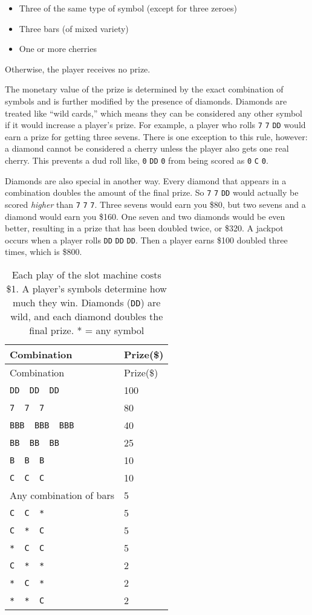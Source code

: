 \documentclass[
  letterpaper,
  DIV=11,
  numbers=noendperiod]{scrbook}
\providecommand{\tightlist}{%
  \setlength{\itemsep}{0pt}\setlength{\parskip}{0pt}}
\begin{document}
\begin{itemize}
\tightlist
\item
  Three of the same type of symbol (except for three zeroes)
\item
  Three bars (of mixed variety)
\item
  One or more cherries
\end{itemize}

Otherwise, the player receives no prize.

The monetary value of the prize is determined by the exact combination
of symbols and is further modified by the presence of diamonds. Diamonds
are treated like ``wild cards,'' which means they can be considered any
other symbol if it would increase a player's prize. For example, a
player who rolls \texttt{7} \texttt{7} \texttt{DD} would earn a prize
for getting three sevens. There is one exception to this rule, however:
a diamond cannot be considered a cherry unless the player also gets one
real cherry. This prevents a dud roll like, \texttt{0} \texttt{DD}
\texttt{0} from being scored as \texttt{0} \texttt{C} \texttt{0}.

Diamonds are also special in another way. Every diamond that appears in
a combination doubles the amount of the final prize. So \texttt{7}
\texttt{7} \texttt{DD} would actually be scored \emph{higher} than
\texttt{7} \texttt{7} \texttt{7}. Three sevens would earn you \$80, but
two sevens and a diamond would earn you \$160. One seven and two
diamonds would be even better, resulting in a prize that has been
doubled twice, or \$320. A jackpot occurs when a player rolls
\texttt{DD} \texttt{DD} \texttt{DD}. Then a player earns \$100 doubled
three times, which is \$800.

\begin{longtable}[]{@{}ll@{}}
\caption{Each play of the slot machine costs \$1. A player's symbols
determine how much they win. Diamonds (\texttt{DD}) are wild, and each
diamond doubles the final prize. * = any
symbol}\label{tbl-prizes}\tabularnewline
\toprule\noalign{}
Combination & Prize(\$) \\
\midrule\noalign{}
\endfirsthead
\toprule\noalign{}
Combination & Prize(\$) \\
\midrule\noalign{}
\endhead
\bottomrule\noalign{}
\endlastfoot
\texttt{DD\ \ DD\ \ DD} & 100 \\
\texttt{7\ \ 7\ \ 7} & 80 \\
\texttt{BBB\ \ BBB\ \ BBB} & 40 \\
\texttt{BB\ \ BB\ \ BB} & 25 \\
\texttt{B\ \ B\ \ B} & 10 \\
\texttt{C\ \ C\ \ C} & 10 \\
Any combination of bars & 5 \\
\texttt{C\ \ C\ \ *} & 5 \\
\texttt{C\ \ *\ \ C} & 5 \\
\texttt{*\ \ C\ \ C} & 5 \\
\texttt{C\ \ *\ \ *} & 2 \\
\texttt{*\ \ C\ \ *} & 2 \\
\texttt{*\ \ *\ \ C} & 2 \\
\end{longtable}
\end{document}
